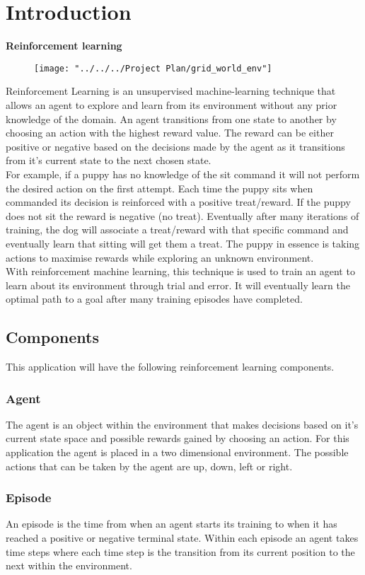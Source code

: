 \chapter{Introduction}
\textbf{Reinforcement learning}\\
\begin{figure}[H]
	\centering
	\texttt{[image: "../../../Project Plan/grid\_world\_env"]}
	\caption{}
	\label{fig:gridworldenv}
\end{figure}
Reinforcement Learning is an unsupervised machine-learning technique that allows an agent to explore and learn from its environment without any prior knowledge of the domain. 
An agent transitions from one state to another by choosing an action with the highest reward value. The reward can be either positive or negative based on the decisions made by the agent as it transitions from it's current state to the next chosen state.\\
For example, if a puppy has no knowledge of the sit command it will not perform the desired action on the first attempt. Each time the puppy sits when commanded its decision is reinforced with a positive treat/reward. If the puppy does not sit the reward is negative (no treat). Eventually after many iterations of training, the dog will associate a treat/reward with that specific command and eventually learn that sitting will get them a treat. 
The puppy in essence is taking actions to maximise rewards while exploring an unknown environment.\\
With reinforcement machine learning, this technique is used to train an agent to learn about its environment through trial and error. It will eventually learn the optimal path to a goal after many training episodes have completed.
\section{Components}
This application will have the following reinforcement learning components.
\subsection{Agent}
The agent is an object within the environment that makes decisions based on it's current state space and possible rewards gained by choosing an action. For this application the agent is placed in a two dimensional environment. The possible actions that can be taken by the agent are up, down, left or right.\\
\subsection{Episode}
An episode is the time from when an agent starts its training to when it has reached a positive or negative terminal state. Within each episode an agent takes time steps where each time step is the transition from its current position to the next within the environment.
